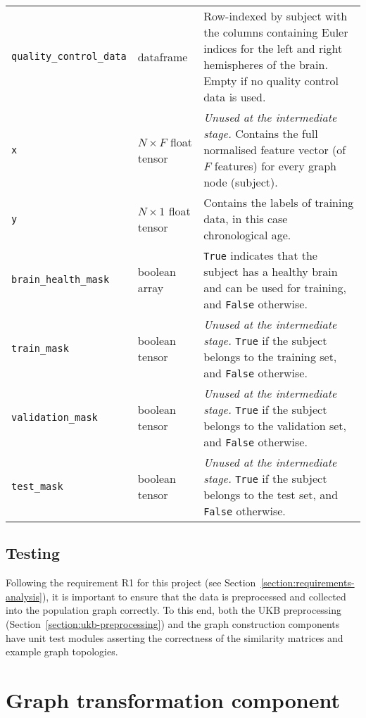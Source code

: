 \begin{center}
\begin{longtable}[]{lp{}p{}}
    \texttt{quality\_control\_data} & dataframe & Row-indexed by subject with the columns containing Euler indices for the left and right hemispheres of the brain. Empty if no quality control data is used. \\
    \texttt{x} & $N \times F$ \hfill\newline float tensor & \textit{Unused at the intermediate stage.} Contains the full normalised feature vector (of $F$ features) for every graph node (subject). \\
    \texttt{y} & $N \times 1$ \hfill \newline float tensor & Contains the labels of training data, in this case chronological age. \\
    \texttt{brain\_health\_mask} & boolean array & \texttt{True} indicates that the subject has a healthy brain and can be used for training, and \texttt{False} otherwise. \\
    \texttt{train\_mask} & boolean tensor & \textit{Unused at the intermediate stage.} \texttt{True} if the subject belongs to the training set, and \texttt{False} otherwise. \\
    \texttt{validation\_mask} & boolean tensor & \textit{Unused at the intermediate stage.} \texttt{True} if the subject belongs to the validation set, and \texttt{False} otherwise. \\
    \texttt{test\_mask} & boolean tensor & \textit{Unused at the intermediate stage.} \texttt{True} if the subject belongs to the test set, and \texttt{False} otherwise.
\end{longtable}
\end{center}

\subsection{Testing}
Following the requirement R1 for this project (see Section~\ref{section:requirements-analysis}), it is important to ensure that the data is preprocessed and collected into the population graph correctly. To this end, both the UKB preprocessing (Section~\ref{section:ukb-preprocessing}) and the graph construction components have unit test modules asserting the correctness of the similarity matrices and example graph topologies.

\section{Graph transformation component}
\label{section:graph-transformation}

